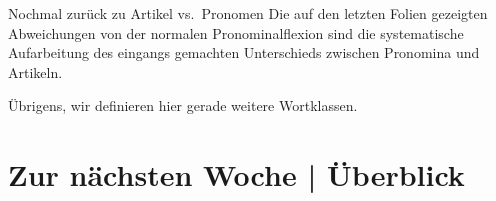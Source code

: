 \begin{frame}
  {Nochmal zurück zu Artikel vs.\ Pronomen}
  \pause
  Die auf den letzten Folien gezeigten Abweichungen von der normalen Pronominalflexion sind die systematische Aufarbeitung des eingangs gemachten Unterschieds zwischen Pronomina und Artikeln.\\
  \pause
  \Zeile
  \begin{center}
  \end{center}
  \pause
  \Halbzeile
  Übrigens, wir definieren hier gerade weitere Wortklassen.
\end{frame}

\ifdefined\TITLE
  \section{Zur nächsten Woche | Überblick}

